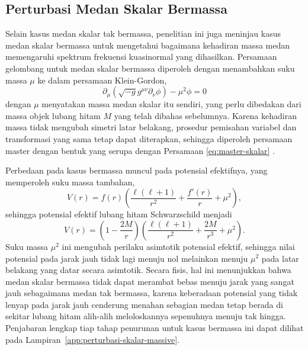 \subsection{Perturbasi Medan Skalar Bermassa}
\label{subsec:perturbasi-skalar-bermassa}

\noindent Selain kasus medan skalar tak bermassa, penelitian ini juga meninjau kasus medan 
skalar bermassa untuk mengetahui bagaimana kehadiran massa medan memengaruhi spektrum 
frekuensi kuasinormal yang dihasilkan. Persamaan gelombang untuk medan skalar bermassa 
diperoleh dengan menambahkan suku massa $\mu$ ke dalam persamaan Klein-Gordon,
\begin{equation}
    \partial_\mu \left(\sqrt{-g} g^{\mu\nu} \partial_\nu \phi\right) - \mu^2 \phi = 0
    \label{eq:medan-skalar-bermassa}
\end{equation}
dengan $\mu$ menyatakan massa medan skalar itu sendiri, yang perlu dibedakan dari massa 
objek lubang hitam $M$ yang telah dibahas sebelumnya. Karena kehadiran massa tidak mengubah simetri latar belakang, prosedur pemisahan variabel dan transformasi yang sama tetap dapat diterapkan, sehingga diperoleh persamaan master dengan bentuk yang serupa dengan Persamaan \eqref{eq:master-skalar} \parencite{Konoplya2011,Berti2016}.

Perbedaan pada kasus bermassa muncul pada potensial efektifnya, yang memperoleh suku massa tambahan,
\begin{equation}
    V(r) = f(r) \left( \frac{\ell(\ell+1)}{r^2} + \frac{f'(r)}{r} + \mu^2 \right),
    \label{eq:potensial-bermassa}
\end{equation}
sehingga potensial efektif lubang hitam Schwarzschild menjadi
\begin{equation}
    V(r) = \left( 1 - \frac{2M}{r} \right) \left( \frac{\ell(\ell+1)}{r^2} + \frac{2M}{r^3} + \mu^2 \right).
    \label{eq:potensial-schwarzschild-bermassa}
\end{equation}
Suku massa $\mu^2$ ini mengubah perilaku asimtotik potensial efektif, sehingga nilai potensial 
pada jarak jauh tidak lagi menuju nol melainkan menuju $\mu^2$ pada latar belakang yang datar 
secara asimtotik. Secara fisis, hal ini menunjukkan bahwa medan skalar bermassa tidak dapat 
merambat bebas menuju jarak yang sangat jauh sebagaimana medan tak bermassa, karena keberadaan 
potensial yang tidak lenyap pada jarak jauh cenderung menahan sebagian medan tetap berada di 
sekitar lubang hitam alih-alih meloloskannya sepenuhnya menuju tak hingga. Penjabaran lengkap 
tiap tahap penurunan untuk kasus bermassa ini dapat dilihat pada Lampiran~\ref{app:perturbasi-skalar-massive}.